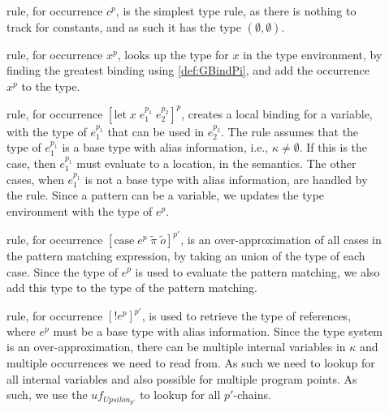 \documentclass[../../master.tex]{subfiles}
\begin{document}
\begin{description}
	\item[] rule, for occurrence $c^p$, is the simplest type rule, as there is nothing to track for constants, and as such it has the type $(\emptyset,\emptyset)$.

	\item[] rule, for occurrence $x^p$, looks up the type for $x$ in the type environment, by finding the greatest binding using \cref{def:GBindPi}, and add the occurrence $x^p$ to the type.

	\item[] rule, for occurrence $[\mbox{let}\;x\;e_1^{p_1}\;e_2^{p_2}]^p$, creates a local binding for a variable, with the type of $e_1^{p_1}$ that can be used in $e_2^{p_2}$.
		The  rule assumes that the type of $e_1^{p_1}$ is a base type with alias information, i.e., $\kappa\neq\emptyset$.
		If this is the case, then $e_1^{p_1}$ must evaluate to a location, in the semantics.
		The other cases, when $e_1^{p_1}$ is not a base type with alias information, are handled by the  rule.
		Since a pattern can be a variable, we updates the type environment with the type of $e^p$.

	\item[] rule, for occurrence $[\mbox{case}\;e^{p}\;\tilde{\pi}\;\tilde{o}]^{p'}$, is an over-approximation of all cases in the pattern matching expression, by taking an union of the type of each case.
		Since the type of $e^p$ is used to evaluate the pattern matching, we also add this type to the type of the pattern matching.

	\item[] rule, for occurrence $[!e^{p}]^{p'}$, is used to retrieve the type of references, where $e^p$ must be a base type with alias information.
		Since the type system is an over-approximation, there can be multiple internal variables in $\kappa$ and multiple occurrences we need to read from.
		As such we need to lookup for all internal variables and also possible for multiple program points.
		As such, we use the $uf_{Upsilon_{p'}}$ to lookup for all $p'$-chains.
\end{description}
\end{document}
